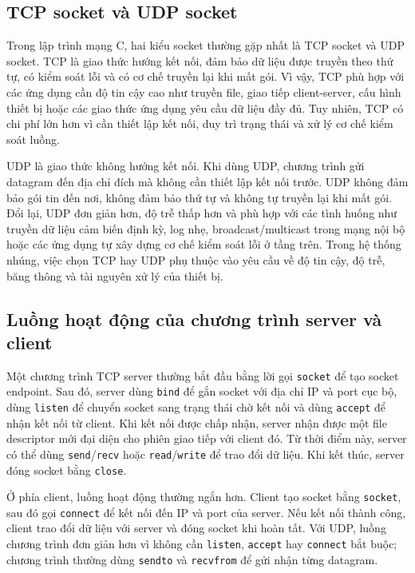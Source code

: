 \documentclass[11pt]{article}
\newcommand{\code}[1]{\texttt{#1}}
\begin{document}
\subsection{TCP socket và UDP socket}

Trong lập trình mạng C, hai kiểu socket thường gặp nhất là TCP socket và UDP socket. TCP là giao thức hướng kết nối, đảm bảo dữ liệu được truyền theo thứ tự, có kiểm soát lỗi và có cơ chế truyền lại khi mất gói. Vì vậy, TCP phù hợp với các ứng dụng cần độ tin cậy cao như truyền file, giao tiếp client-server, cấu hình thiết bị hoặc các giao thức ứng dụng yêu cầu dữ liệu đầy đủ. Tuy nhiên, TCP có chi phí lớn hơn vì cần thiết lập kết nối, duy trì trạng thái và xử lý cơ chế kiểm soát luồng.

UDP là giao thức không hướng kết nối. Khi dùng UDP, chương trình gửi datagram đến địa chỉ đích mà không cần thiết lập kết nối trước. UDP không đảm bảo gói tin đến nơi, không đảm bảo thứ tự và không tự truyền lại khi mất gói. Đổi lại, UDP đơn giản hơn, độ trễ thấp hơn và phù hợp với các tình huống như truyền dữ liệu cảm biến định kỳ, log nhẹ, broadcast/multicast trong mạng nội bộ hoặc các ứng dụng tự xây dựng cơ chế kiểm soát lỗi ở tầng trên. Trong hệ thống nhúng, việc chọn TCP hay UDP phụ thuộc vào yêu cầu về độ tin cậy, độ trễ, băng thông và tài nguyên xử lý của thiết bị.

\subsection{Luồng hoạt động của chương trình server và client}

Một chương trình TCP server thường bắt đầu bằng lời gọi \code{socket} để tạo socket endpoint. Sau đó, server dùng \code{bind} để gắn socket với địa chỉ IP và port cục bộ, dùng \code{listen} để chuyển socket sang trạng thái chờ kết nối và dùng \code{accept} để nhận kết nối từ client. Khi kết nối được chấp nhận, server nhận được một file descriptor mới đại diện cho phiên giao tiếp với client đó. Từ thời điểm này, server có thể dùng \code{send}/\code{recv} hoặc \code{read}/\code{write} để trao đổi dữ liệu. Khi kết thúc, server đóng socket bằng \code{close}.

Ở phía client, luồng hoạt động thường ngắn hơn. Client tạo socket bằng \code{socket}, sau đó gọi \code{connect} để kết nối đến IP và port của server. Nếu kết nối thành công, client trao đổi dữ liệu với server và đóng socket khi hoàn tất. Với UDP, luồng chương trình đơn giản hơn vì không cần \code{listen}, \code{accept} hay \code{connect} bắt buộc; chương trình thường dùng \code{sendto} và \code{recvfrom} để gửi nhận từng datagram.
\end{document}
